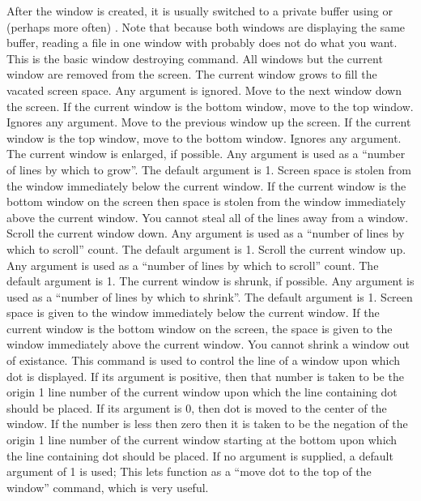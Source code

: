 \begin{cmdlist}
After the window is created, it is usually switched to a private
buffer using  or (perhaps more often) .
Note that because
both windows are displaying the same buffer, reading a file in one
window with  probably does not do what you want.
This is the basic window destroying command. All windows but
the current window are removed from the screen. The current window grows
to fill the vacated screen space. Any argument is ignored.
Move to the next window down the screen. If the current window
is the bottom window, move to the top window. Ignores any argument.
Move to the previous window up the screen. If the current window
is the top window, move to the bottom window. Ignores any argument.
The current window is enlarged, if possible. Any argument is
used as a ``number of lines by which to grow''. The default argument is 1.
Screen space is stolen from the window immediately below the current
window. If the current window is the bottom window on the screen then
space is stolen from the window immediately above the current window.
You cannot steal all of the lines away from a window.
Scroll the current window down. Any argument is used as a
``number of lines by which to scroll'' count. The default argument is 1.
Scroll the current window up. Any argument is used as a
``number of lines by which to scroll'' count. The default argument is 1.
The current window is shrunk, if possible. Any argument is
used as a ``number of lines by which to shrink''. The default argument is 1.
Screen space is given to the window immediately below the current window.
If the current window is the bottom window on the screen, the space is
given to the window immediately above the current window. You cannot shrink
a window out of existance.
This command is used to control the line of a window upon
which dot is displayed. If its argument is positive, then that number is
taken to be the origin 1 line number of the current window upon which
the line containing dot should be placed. If its argument is 0, then dot
is moved to the center of the window. If the number is less then zero
then it is taken to be the negation of the origin 1 line number of the
current window starting at the bottom upon which the line containing dot
should be placed. If no argument is supplied, a default argument of 1 is
used; This lets  function as a ``move dot to the top of the window''
command, which is very useful.
\end{cmdlist}
